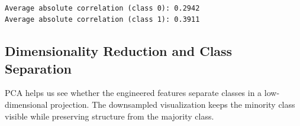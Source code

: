 \documentclass[11pt]{article}
\begin{document}
    \begin{center}
    \end{center}
    { \hspace*{\fill} \\}
    
    \begin{Verbatim}[commandchars=\\\{\}]
Average absolute correlation (class 0): 0.2942
Average absolute correlation (class 1): 0.3911
    \end{Verbatim}

    \subsection{Dimensionality Reduction and Class
Separation}\label{dimensionality-reduction-and-class-separation}

PCA helps us see whether the engineered features separate classes in a
low-dimensional projection. The downsampled visualization keeps the
minority class visible while preserving structure from the majority
class.
\end{document}
